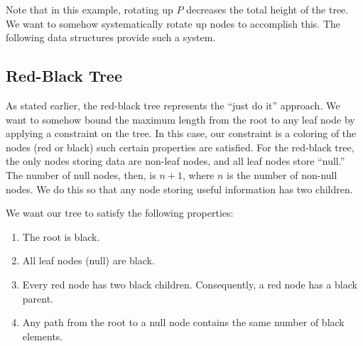 Note that in this example, rotating up $P$ decreases the total height of the tree. We want to somehow systematically rotate up nodes to accomplish this. The following data structures provide such a system.

\subsection{Red-Black Tree}

As stated earlier, the red-black tree represents the ``just do it'' approach. We want to somehow bound the maximum length from the root to any leaf node by applying a constraint on the tree. In this case, our constraint is a coloring of the nodes (red or black) such certain properties are satisfied. For the red-black tree, the only nodes storing data are non-leaf nodes, and all leaf nodes store ``null.'' The number of null nodes, then, is $n+1$, where $n$ is the number of non-null nodes. We do this so that any node storing useful information has two children.

We want our tree to satisfy the following properties:

\begin{enumerate}

\item
The root is black.

\item
All leaf nodes (null) are black.

\item
Every red node has two black children. Consequently, a red node has a black parent.

\item
Any path from the root to a null node contains the same number of black elements.

\end{enumerate}

